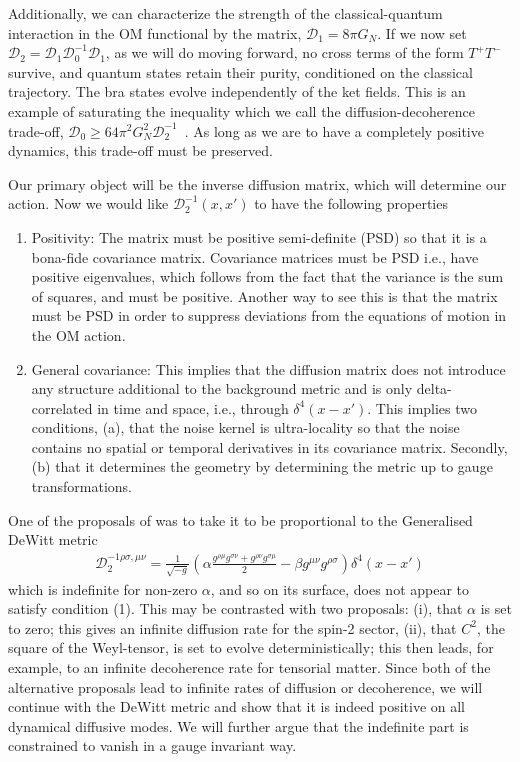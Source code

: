 \documentclass[aps,preprintnumbers,superscriptaddress,longbibliography]{revtex4-1}
\begin{document}
Additionally, we can characterize the strength of the classical-quantum interaction in the  OM functional by the matrix, $\mathcal{D}_1=8\pi G_N$. If we now set $\mathcal{D}_2=\mathcal{D}_1\mathcal{D}_0^{-1}\mathcal{D}_1$,  as we will do moving forward,  no cross terms of the form $T^{+}T^{-}$ survive,  and quantum states retain their purity, conditioned on the classical trajectory. The bra states evolve independently of the ket fields. This is an example of saturating the inequality which we call the diffusion-decoherence trade-off, $\mathcal{D}_0\geq 64\pi^2G_N^2\mathcal{D}_2^{-1}$~\cite{oppenheim2023covariant}. As long as we are to have a completely positive dynamics, this trade-off must be preserved\cite{oppenheim2023gravitationally}.

Our primary object will be the inverse diffusion matrix, which will determine our action. Now we would like $\mathcal{D}_{2}^{-1}(x,x')$ to have the following properties
\begin{enumerate}
    \item Positivity: The matrix must be positive semi-definite (PSD) so that it is a bona-fide covariance matrix.  Covariance matrices must be PSD i.e., have positive eigenvalues, which follows from the fact that the variance is the sum of squares, and must be positive. Another way to see this is that the matrix must be PSD in order to suppress deviations from the equations of motion in the OM action.
    \item General covariance: This implies that the diffusion matrix does not introduce any  structure additional to the background metric and is only delta-correlated in time and space, i.e., through $\delta^4(x-x')$. This implies two conditions, (a), that the noise kernel is ultra-locality so that the noise contains no spatial or temporal derivatives in its covariance matrix. Secondly, (b) that it determines the geometry by determining the metric up to gauge transformations.
\end{enumerate}

One of the proposals of \cite{oppenheim2023covariant} was to take it to be proportional to the Generalised DeWitt metric\cite{dewitt1967quantum}
\begin{align}
\label{eq:dewitt}
\mathcal{D}_2^{-1 \rho\sigma,\mu\nu}=\frac{1}{\sqrt{-g^{}}}(\alpha\frac{g^{\rho\mu }g^{\sigma\nu}+g^{\rho\nu}g^{\sigma\mu}}{2}-\beta g^{\mu\nu}g^{\rho\sigma})\delta^{4}(x-x')
\end{align}
which is indefinite for non-zero $\alpha$, and so on its surface, does not appear to satisfy condition (1). This may be contrasted with two proposals: (i), that $\alpha$ is set to zero; this gives an infinite diffusion rate for the spin-2 sector, (ii), that $C^2$, the square of the Weyl-tensor, is set to evolve deterministically; this then leads, for example, to an infinite decoherence rate for tensorial matter. Since both of the alternative proposals lead to infinite rates of diffusion or decoherence, we will continue with the DeWitt metric and show that it is indeed positive on all dynamical diffusive modes. We will further argue that the indefinite part is constrained to vanish  in a gauge invariant way. 
\end{document}
